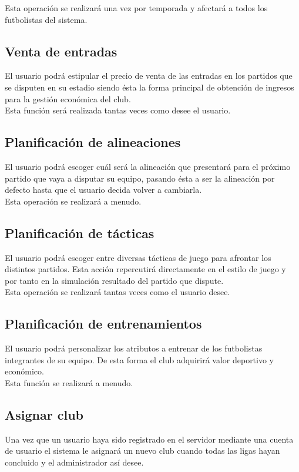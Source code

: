 Esta operación se realizará una vez por temporada y afectará a todos
los futbolistas del sistema.
\subsection{Venta de entradas}
El usuario podrá estipular el precio de venta de las entradas en los
partidos que se disputen en su estadio siendo ésta la forma principal
de obtención de ingresos para la gestión económica del club.\\

Esta función será realizada tantas veces como desee el usuario.

\subsection{Planificación de alineaciones}
El usuario podrá escoger cuál será la alineación que presentará para
el próximo partido que vaya a disputar su equipo, pasando ésta a ser
la alineación por defecto hasta que el usuario decida volver a
cambiarla.\\

Esta operación se realizará a menudo.
\subsection{Planificación de tácticas}
El usuario podrá escoger entre diversas tácticas de juego para
afrontar los distintos partidos. Esta acción repercutirá directamente
en el estilo de juego y por tanto en la simulación resultado del
partido que dispute.\\

Esta operación se realizará tantas veces como el usuario desee.
\subsection{Planificación de entrenamientos}
El usuario podrá personalizar los atributos a entrenar de los
futbolistas integrantes de su equipo. De esta forma el club adquirirá
valor deportivo y económico.\\

Esta función se realizará a menudo.

\subsection{Asignar club}
Una vez que un usuario haya sido registrado en el servidor mediante
una cuenta de usuario el sistema le asignará un nuevo club cuando
todas las ligas hayan concluido y el administrador así desee.\\

